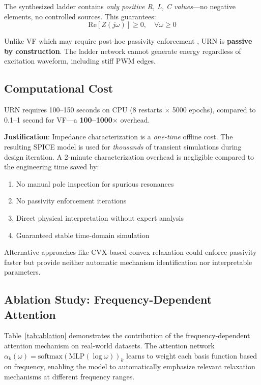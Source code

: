 \documentclass{ieeeaccess}
\begin{document}
The synthesized ladder contains \textit{only positive R, L, C values}---no negative elements, no controlled sources. This guarantees:
\begin{equation}
\text{Re}[Z(j\omega)] \geq 0, \quad \forall \omega \geq 0
\end{equation}

Unlike VF which may require post-hoc passivity enforcement \cite{gustavsen2008passivity}, URN is \textbf{passive by construction}. The ladder network cannot generate energy regardless of excitation waveform, including stiff PWM edges.

\subsection{Computational Cost}
\label{sec:cost}

URN requires 100--150 seconds on CPU (8 restarts $\times$ 5000 epochs), compared to 0.1--1 second for VF---a \textbf{100--1000$\times$} overhead.

\textbf{Justification}: Impedance characterization is a \textit{one-time} offline cost. The resulting SPICE model is used for \textit{thousands} of transient simulations during design iteration. A 2-minute characterization overhead is negligible compared to the engineering time saved by:
\begin{enumerate}
\item No manual pole inspection for spurious resonances
\item No passivity enforcement iterations
\item Direct physical interpretation without expert analysis
\item Guaranteed stable time-domain simulation
\end{enumerate}

Alternative approaches like CVX-based convex relaxation could enforce passivity faster but provide neither automatic mechanism identification nor interpretable parameters.

\subsection{Ablation Study: Frequency-Dependent Attention}
\label{sec:ablation}

Table~\ref{tab:ablation} demonstrates the contribution of the frequency-dependent attention mechanism on real-world datasets. The attention network $\alpha_k(\omega) = \text{softmax}(\text{MLP}(\log\omega))_k$ learns to weight each basis function based on frequency, enabling the model to automatically emphasize relevant relaxation mechanisms at different frequency ranges.
\end{document}
